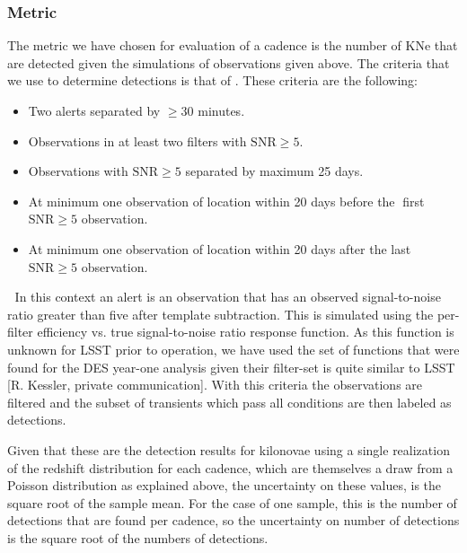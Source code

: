 \subsubsection{Metric}
The metric we have chosen for evaluation of a cadence is the number of KNe that are detected given the simulations of observations given above. The criteria that we use to determine detections is that of \citep{Scolnic2017a}. These criteria are the following:
\begin{itemize}
  \item Two alerts separated by $\geq 30$ minutes.
  \item Observations in at least two filters with $\mathrm{SNR} \geq 5$.
  \item Observations with $\mathrm{SNR} \geq 5$ separated by maximum 25 days.
  \item At minimum one observation of location within 20 days before the first $\mathrm{SNR} \geq 5$ observation.
  \item At minimum one observation of location within 20 days after the last $\mathrm{SNR} \geq 5$ observation.
\end{itemize}

In this context an alert is an observation that has an observed signal-to-noise ratio greater than five after template subtraction. This is simulated using the per-filter efficiency vs. true signal-to-noise ratio response function. As this function is unknown for LSST prior to operation, we have used the set of functions that were found for the DES year-one analysis given their filter-set is quite similar to LSST [R. Kessler, private communication]. With this criteria the observations are filtered and the subset of transients which pass all conditions are then labeled as detections.\par
Given that these are the detection results for kilonovae using a single realization of the redshift distribution for each cadence, which are themselves a draw from a Poisson distribution as explained above, the uncertainty on these values, is the square root of the sample mean. For the case of one sample, this is the number of detections that are found per cadence, so the uncertainty on number of detections is the square root of the numbers of detections.\par
